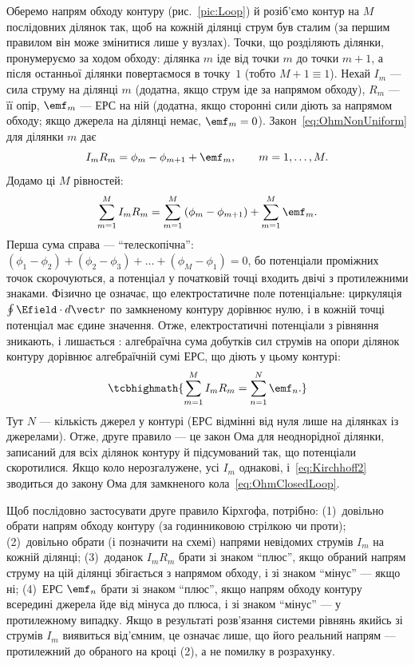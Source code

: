 Оберемо напрям обходу контуру (рис.~\ref{pic:Loop}) й розіб'ємо контур на $M$ послідовних ділянок так, щоб на кожній ділянці струм був сталим (за першим
правилом він може змінитися лише у вузлах). Точки, що розділяють ділянки, пронумеруємо за ходом обходу: ділянка $m$ іде від точки $m$ до точки
$m+1$, а після останньої ділянки повертаємося в точку~$1$ (тобто $M+1\equiv 1$). Нехай $I_m$ --- сила струму на ділянці $m$ (додатна, якщо струм
іде за напрямом обходу), $R_m$ --- її опір, $\emf_m$ --- ЕРС на ній (додатна, якщо сторонні сили діють за напрямом обходу; якщо джерела на
ділянці немає, $\emf_m = 0$). Закон~\eqref{eq:OhmNonUniform} для ділянки $m$ дає
\begin{equation*}
	I_m R_m = \phi_m - \phi_{m+1} + \emf_m, \qquad m = 1,\dots,M.
\end{equation*}
Додамо ці $M$ рівностей:
\begin{equation*}
	\sum\limits_{m=1}^M I_m R_m = \sum\limits_{m=1}^M \left(\phi_m - \phi_{m+1}\right) + \sum\limits_{m=1}^M \emf_m.
\end{equation*}
Перша сума справа --- \enquote{телескопічна}: $(\phi_1-\phi_2)+(\phi_2-\phi_3)+\dots+(\phi_M-\phi_1)=0$, бо потенціали проміжних точок
скорочуються, а потенціал у початковій точці входить двічі з протилежними знаками. Фізично це означає, що електростатичне поле потенціальне:
циркуляція $\oint \Efield\cdot d\vect r$ по замкненому контуру дорівнює нулю, і в кожній точці потенціал має єдине значення. Отже, електростатичні
потенціали з рівняння зникають, і лишається : алгебраїчна сума добутків сил струмів на опори ділянок контуру дорівнює
алгебраїчній сумі ЕРС, що діють у цьому контурі:
\begin{equation}\label{eq:Kirchhoff2}
	\tcbhighmath{
		\sum\limits_{m=1}^M I_m R_m = \sum\limits_{n=1}^N \emf_n.
	}
\end{equation}
Тут $N$ --- кількість джерел у контурі (ЕРС відмінні від нуля лише на ділянках із джерелами). Отже, друге правило --- це закон Ома для
неоднорідної ділянки, записаний для всіх ділянок контуру й підсумований так, що потенціали скоротилися. Якщо коло нерозгалужене, усі $I_m$
однакові, і~\eqref{eq:Kirchhoff2} зводиться до закону Ома для замкненого кола~\eqref{eq:OhmClosedLoop}.

\begin{Attention}
	Щоб послідовно застосувати друге правило Кірхгофа, потрібно: (1)~довільно обрати напрям обходу контуру (за годинниковою стрілкою чи проти);
	(2)~довільно обрати (і позначити на схемі) напрями невідомих струмів $I_m$ на кожній ділянці; (3)~доданок $I_mR_m$ брати зі знаком \enquote{плюс}, якщо
	обраний напрям струму на цій ділянці збігається з напрямом обходу, і зі знаком \enquote{мінус} --- якщо ні; (4)~ЕРС $\emf_n$ брати зі знаком
	\enquote{плюс}, якщо напрям обходу контуру всередині джерела йде від мінуса до плюса, і зі знаком \enquote{мінус} --- у протилежному випадку. Якщо в результаті
	розв'язання системи рівнянь якийсь зі струмів $I_m$ виявиться від'ємним, це означає лише, що його реальний напрям --- протилежний до обраного
	на кроці (2), а не помилку в розрахунку.
\end{Attention}

